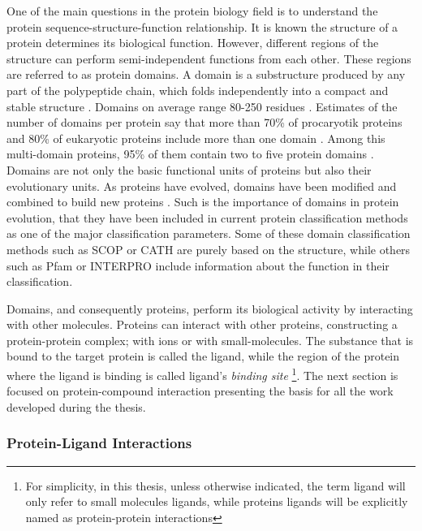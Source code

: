 \documentclass[11pt, b5paper,twoside]{tesi_upf}
\begin{document}
\par One of the main questions in the protein biology field is to understand the protein sequence-structure-function relationship. It is known the structure of a protein determines its biological function. However, different regions of the structure can perform semi-independent functions from each other. These regions are referred to as protein domains. A domain is a substructure produced by any part of the polypeptide chain, which folds independently into a compact and stable structure \cite{Richardson1981, Bork1991, DomainDef}. Domains on average range 80-250 residues \cite{Islam1995}. Estimates of the number of domains per protein say that more than 70\% of procaryotik proteins and 80\% of eukaryotic proteins include more than one domain \cite{Han2007, Chothia2003}. Among this multi-domain proteins, 95\% of them contain two to five protein domains \cite{Han2007}.  Domains are not only the basic functional units of proteins but also their evolutionary units. As proteins have evolved, domains have been modified and combined to build new proteins \cite{Vogel2004, Apic2001}. 
Such is the importance  of domains in protein evolution, that they have been included in current protein classification methods as one of the major classification parameters. Some of these domain classification methods such as SCOP \cite{Murzin1995} or CATH \cite{Orengo1997} are purely based on the structure, while others such as Pfam \cite{Bateman2002} or INTERPRO \cite{Hunter2009} include information about the function in their classification. 
\par Domains, and consequently proteins, perform its biological activity by interacting with other molecules. Proteins can interact with other proteins, constructing a protein-protein complex; with ions or with small-molecules. The substance that is bound to the target protein is called the ligand, while the region of the protein where the ligand is binding is called ligand's \textit{binding site} \footnote{For simplicity, in this thesis, unless otherwise indicated, the term ligand will only refer to small molecules ligands, while proteins ligands will be explicitly named as protein-protein interactions}. The next section is focused on protein-compound interaction presenting the basis for all the work developed during the thesis. 



\subsubsection{Protein-Ligand Interactions} \label{ligand_intect}
\end{document}
